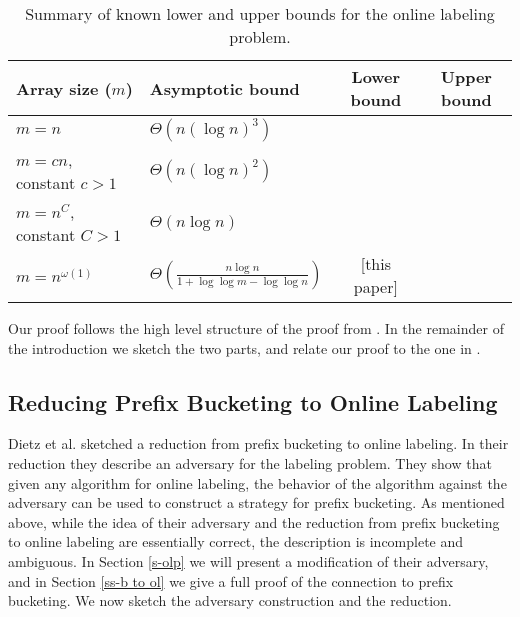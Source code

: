 \documentclass[11pt]{article}
\newcommand{\PTheta}[1]{\Theta\!\left(#1\right)}
\begin{document}
\begin{table}
\centering
\caption{Summary of known lower and upper bounds for the online labeling problem.} \label{tab-1}
\begin{tabular}{l l c c}
	\toprule
	Array size ($m$) &
	Asymptotic bound &
	Lower bound &
	Upper bound
	\\ \toprule

	$m = n$ &
	$\PTheta{n (\log n)^3}$ &
	\cite{BKS} &
	\cite{Zhang}
	\\ \midrule

	$m = cn$,\,constant $c>1$ &
	$\PTheta{n (\log n)^2}$ &
	\cite{BKS} &
	\cite{Itaietal}
	\\ \midrule

%	
	
	$m = n ^ {C}$,\, constant $C>1$ &
	$\PTheta{n \log n}$ &
	\cite{DSZ04} &
	\cite{Itaietal}
	\\ \midrule
	
	$m = n ^ {\omega(1)}$ &
	$\PTheta{\frac{n \log n}{1 + \log \log m - \log \log n}}$ &
	[this paper] &
	\cite{BKS}
	\\ \bottomrule
\end{tabular}
\label{table:table_bounds}
\end{table}

Our proof follows the high level structure of the proof from \cite{DSZ04}.  In the remainder of the introduction we sketch the two
parts, and relate our proof to the one in \cite{DSZ04}.

\subsection{Reducing Prefix Bucketing to Online Labeling}
\label{s-1.1}

Dietz et al. \cite{DSZ04} sketched a reduction from prefix bucketing to online labeling.  In their reduction they describe an adversary
for the labeling problem.  They show that given any algorithm for online labeling, the behavior of the algorithm
against the adversary can be used to construct a strategy for prefix bucketing.   As mentioned above,
while the idea of their adversary and the reduction from prefix bucketing to online labeling are essentially correct,
the description is incomplete and ambiguous.  In Section \ref{s-olp} we will present a modification of their adversary, 
and in Section \ref{ss-b to ol} we give a full proof of the
connection to prefix bucketing.  We now sketch the adversary construction and the reduction.
\end{document}
